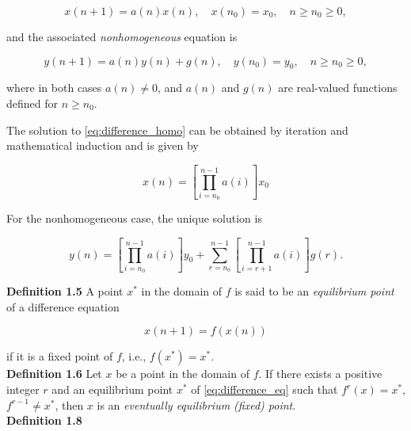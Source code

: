 \documentclass[12pt]{article}
\begin{document}
\begin{equation}
    x(n+1) = a(n)x(n), \quad x(n_0) = x_0, \quad n \geq n_0 \geq 0, \label{eq:difference_homo}
\end{equation}

\noindent and the associated \emph{nonhomogeneous} equation is

\begin{equation}
    y(n+1) = a(n)y(n) + g(n), \quad y(n_0) = y_0, \quad n \geq n_0 \geq 0, \label{eq:difference_nonhomo}
\end{equation}

\noindent where in both cases \(a(n) \neq 0\), and \(a(n)\) and \(g(n)\) are real-valued functions defined for \(n \geq n_0\).

The solution to \eqref{eq:difference_homo} can be obtained by iteration and mathematical induction and is given by

\begin{equation}
    x(n) = \left[\prod_{i=n_0}^{n-1}a(i)\right] x_0
\end{equation}

For the nonhomogeneous case, the unique solution is

\begin{equation}
    y(n) = \left[\prod_{i=n_0}^{n-1}a(i)\right]y_0 +  \sum_{r=n_0}^{n-1}\left[\prod_{i=r+1}^{n-1}a(i)\right]g(r).
\end{equation}

\noindent\textbf{Definition 1.5} A point \(x^*\) in the domain of \(f\) is said to be an \emph{equilibrium point} of a difference equation 

\begin{equation}
    x(n+1) = f(x(n))\label{eq:difference_eq}
\end{equation} 

\noindent if it is a fixed point of \(f\), i.e., \(f(x^*) = x^*\).\\

\noindent\textbf{Definition 1.6} Let \(x\) be a point in the domain of \(f\). If there exists a positive integer \(r\) and an equilibrium point \(x^*\) of \eqref{eq:difference_eq} such that \(f^r(x) = x^*\), \(f^{r-1} \neq x^*\), then \(x\) is an \emph{eventually equilibrium (fixed) point}.\\

\noindent\textbf{Definition 1.8} 
\end{document}
